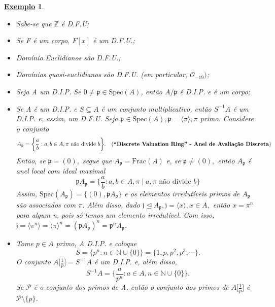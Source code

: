 \documentclass{article}
\newtheorem{example}{\underline{Exemplo}}
\begin{document}
\begin{example}
  \begin{itemize}
    \item[1)] Sabe-se que \(\mathbb{Z}\) é D.F.U;
    \item[2)] Se F é um corpo, \(F[x]\) é um D.F.U.;
    \item[3)] Domínio Euclidianos são D.F.U.;
    \item[4)] Domínios quasi-euclidianos são D.F.U. (em particular, \(\mathcal{O}_{-19})\);
    \item[5)] Seja A um D.I.P. Se \(0\neq\mathfrak{p}\in \mathrm{Spec}(A)\), então \(A/\mathfrak{p}\) é D.I.P. e é um corpo;
    \item[6)] Se A é um D.I.P. e \(S\subseteq{A}\) é um conjunto multiplicativo, então \(S^{-1}A\) é um D.I.P. e, assim, um D.F.U. Seja \(\mathfrak{p}\in \mathrm{Spec}(A), \mathfrak{p} = \langle \pi  \rangle, \pi\) primo. Considere o conjunto 
      \[
        A_{\mathfrak{p}} = \biggl\{\frac{a}{b}: a, b \in A, \pi \text{ não divide } b\biggr\}.\quad \text{(\textbf{``Discrete Valuation Ring'' - Anel de Avaliação Discreta})}
      \]
      Então, se \(\mathfrak{p} = (0),\) segue que \(A_{\mathfrak{p}} = \mathrm{Frac}(A)\) e, se \(\mathfrak{p}\neq (0),\) então
      \(A_{\mathfrak{p}}\) é anel local com ideal maximal 
      \[
        \mathfrak{p}A_{\mathfrak{p}} = \biggl\{\frac{a}{b}: a,b\in A, \pi \mid a, \pi \text{ não divide } b\biggr\}
      \]
      Assim, \(\mathrm{Spec}(A_{\mathfrak{p}}) = \{(0), \mathfrak{p}A_{\mathfrak{p}}\}\) e os elementos irredutíveis primos de \(A_{\mathfrak{p}}\)
      são associados com \(\pi \). Além disso, dado \(\mathfrak{j}\trianglelefteq{A_{\mathfrak{p}}}, \mathfrak{j} = \langle x \rangle, x\in A,\) então
      \(x = \pi ^{n}\) para algum n, pois só temos um elemento irredutível. Com isso, \(\mathfrak{j} = \langle \pi ^{n} \rangle = \langle \pi  \rangle^{n} = (\mathfrak{p}A_{\mathfrak{p}})^{n} = \mathfrak{p}^{n}A_{\mathfrak{p}}\).
    \item[7)] Tome \(p\in A\) primo, A D.I.P. e coloque 
      \[
        S = \{p^{n}: n\in \mathbb{N}\cup \{0\}\} = \{1, p, p^{2}, p^{3}, \cdots\}.
      \]
      O conjunto \(A \biggl[\frac{1}{p}\biggr] = S^{-1}A\) é um D.I.P. e, além disso, 
      \[
        S^{-1}A = \biggl\{\frac{a}{p^{n}}:a\in A, n\in \mathbb{N}\cup\{0\}\biggr\}.
      \]
      Se \(\mathcal{P}\) é o conjunto dos primos de A, então o conjunto dos primos de \(A \biggl[\frac{1}{p}\biggr]\) é 
      \(\mathcal{P}\setminus{\{p\}}\).
  \end{itemize}
\end{example}
\end{document}
